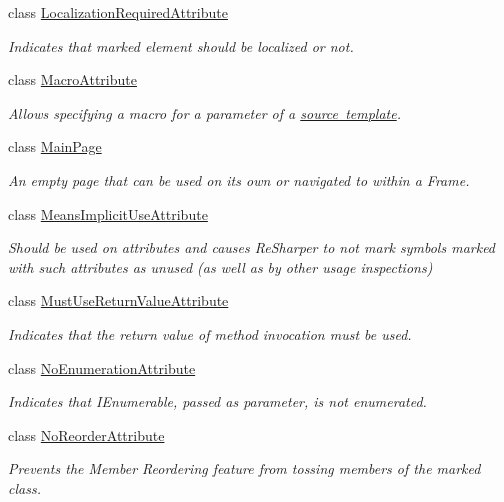 \begin{DoxyCompactItemize}
class \mbox{\hyperlink{class_r_f_storage_1_1_localization_required_attribute}{Localization\+Required\+Attribute}}
\begin{DoxyCompactList}\small\item\em Indicates that marked element should be localized or not. \end{DoxyCompactList}\item 
class \mbox{\hyperlink{class_r_f_storage_1_1_macro_attribute}{Macro\+Attribute}}
\begin{DoxyCompactList}\small\item\em Allows specifying a macro for a parameter of a \mbox{\hyperlink{class_r_f_storage_1_1_source_template_attribute}{source template}}. \end{DoxyCompactList}\item 
class \mbox{\hyperlink{class_r_f_storage_1_1_main_page}{Main\+Page}}
\begin{DoxyCompactList}\small\item\em An empty page that can be used on its own or navigated to within a Frame. \end{DoxyCompactList}\item 
class \mbox{\hyperlink{class_r_f_storage_1_1_means_implicit_use_attribute}{Means\+Implicit\+Use\+Attribute}}
\begin{DoxyCompactList}\small\item\em Should be used on attributes and causes Re\+Sharper to not mark symbols marked with such attributes as unused (as well as by other usage inspections) \end{DoxyCompactList}\item 
class \mbox{\hyperlink{class_r_f_storage_1_1_must_use_return_value_attribute}{Must\+Use\+Return\+Value\+Attribute}}
\begin{DoxyCompactList}\small\item\em Indicates that the return value of method invocation must be used. \end{DoxyCompactList}\item 
class \mbox{\hyperlink{class_r_f_storage_1_1_no_enumeration_attribute}{No\+Enumeration\+Attribute}}
\begin{DoxyCompactList}\small\item\em Indicates that I\+Enumerable, passed as parameter, is not enumerated. \end{DoxyCompactList}\item 
class \mbox{\hyperlink{class_r_f_storage_1_1_no_reorder_attribute}{No\+Reorder\+Attribute}}
\begin{DoxyCompactList}\small\item\em Prevents the Member Reordering feature from tossing members of the marked class. \end{DoxyCompactList}\item 

\end{DoxyCompactItemize}
